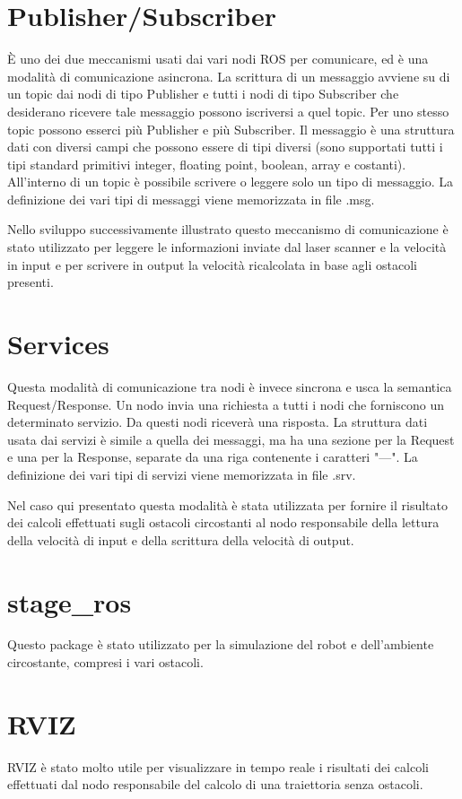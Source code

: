 \documentclass[Lau, binding=0.6cm, twoside]{sapthesis}
\begin{document}
\section{Publisher/Subscriber}
È uno dei due meccanismi usati dai vari nodi ROS per comunicare, ed è una modalità di comunicazione asincrona.
La scrittura di un messaggio avviene su di un topic dai nodi di tipo Publisher e tutti i nodi di tipo Subscriber che desiderano ricevere tale messaggio possono iscriversi a quel topic.
Per uno stesso topic possono esserci più Publisher e più Subscriber.
Il messaggio è una struttura dati con diversi campi che possono essere di tipi diversi (sono supportati tutti i tipi standard primitivi integer, floating point, boolean, array e costanti).
All’interno di un topic è possibile scrivere o leggere solo un tipo di messaggio.
La definizione dei vari tipi di messaggi viene memorizzata in file .msg.

Nello sviluppo successivamente illustrato questo meccanismo di comunicazione è stato utilizzato per leggere le informazioni inviate dal laser scanner e la velocità in input e per scrivere in output la velocità ricalcolata in base agli ostacoli presenti.

\section{Services}
Questa modalità di comunicazione tra nodi è invece sincrona e usca la semantica Request/Response.
Un nodo invia una richiesta a tutti i nodi che forniscono un determinato servizio.
Da questi nodi riceverà una risposta.
La struttura dati usata dai servizi è simile a quella dei messaggi, ma ha una sezione per la Request e una per la Response, separate da una riga contenente i caratteri "---".
La definizione dei vari tipi di servizi viene memorizzata in file .srv.

Nel caso qui presentato questa modalità è stata utilizzata per fornire il risultato dei calcoli effettuati sugli ostacoli circostanti al nodo responsabile della lettura della velocità di input e della scrittura della velocità di output.

\section{stage\_ros}
Questo package è stato utilizzato per la simulazione del robot e dell'ambiente circostante, compresi i vari ostacoli.

\section{RVIZ}
RVIZ è stato molto utile per visualizzare in tempo reale i risultati dei calcoli effettuati dal nodo responsabile del calcolo di una traiettoria senza ostacoli.
\end{document}

